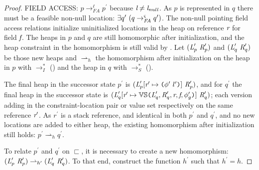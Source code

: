 \begin{proof}
\noindent\textrm{F{\footnotesize IELD}}
\textrm{A{\footnotesize CCESS}}: $p \rightarrow^\ell_\mathit{FA}
p^\prime $ because $\emph{l} \neq \emph{l}_\mathit{null}$. As $p$ is represented in $q$ there must be a feasible non-null location: $\exists q^\prime\ (q
\rightarrow^{\varsigma}_\mathit{FA} q^\prime)$. The non-null pointing field access relations initialize
uninitialized locations in the heap on reference $\emph{r}$ for field
$\emph{f}$. The heaps in $p$ and $q$ are still homomorphic after
initialization, and the heap constraint in the homomorphism is still
valid by . Let $(\emph{L}^\prime_p\ \emph{R}^\prime_p)$ and  
$(\cfgnt{L}^\prime_q\ \cfgnt{R}^\prime_q)$ be those new heaps and $\rightharpoonup_h$
the homomorphism after initialization on the heap in $p$ with
$\rightarrow_I^*$ () and the heap in $q$ with
$\rightarrow_S^*$ ().

The final heap in the successor state $p^\prime$ is
$(\emph{L}^\prime_p [\emph{r}^\prime \mapsto
  \texttt{(}\phi^\prime\ l^\prime\texttt{)}]\ \emph{R}^\prime_p)$, and for $q^\prime$
the final heap in the successor state is
$(\emph{L}^\prime_q[\emph{r}^\prime \mapsto \mathbb{VS}\texttt{(}
  \emph{L}^\prime_q,\emph{R}^\prime_q,\emph{r},\emph{f},\phi^\prime_g\texttt{)}
]\ \emph{R}^\prime_q)$; each version adding in the
constraint-location pair or value set respectively on the same
reference $\emph{r}^\prime$. As $r^\prime$ is a stack reference, and
identical in both $p^\prime$ and $q^\prime$, and no new locations are
added to either heap, the existing homomorphism after initialization
still holds: $p^\prime \rightharpoonup_h q^\prime$.


 To relate $p^\prime$ and $q^\prime$ on
$\sqsubset$, it is necessary to create a new homomorphism:
$(\emph{L}^\prime_p\ \emph{R}^\prime_p) \rightharpoonup_{h^\prime}
(\emph{L}^\prime_q\ \emph{R}^\prime_q)$. To that end, construct the
function $h^\prime$ such that $h^\prime = h$.



\end{proof}
